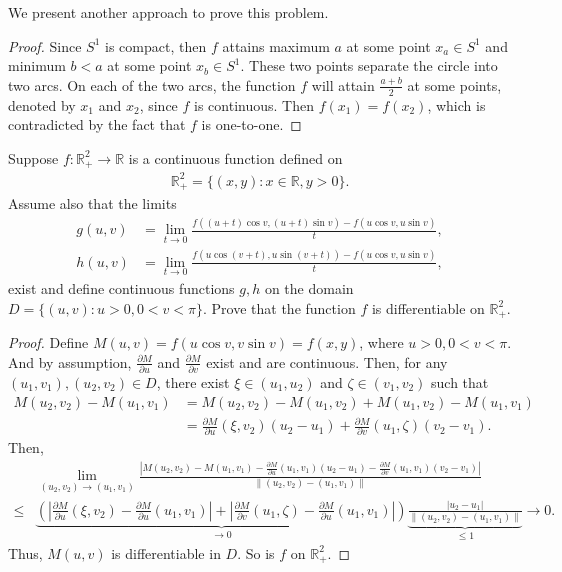 \documentclass[11pt]{article}
\theoremstyle{definition}
\numberwithin{equation}{subsection}
\begin{document}
We present another approach to prove this problem.
\begin{proof}
Since $S^1$ is compact, then $f$ attains maximum $a$ at some point $x_a \in S^1$ and minimum $b < a$ at some point $x_b \in S^1$. These two points separate the circle into two arcs. On each of the two arcs, the function $f$ will attain $\frac{a+b}{2}$ at some points, denoted by $x_1$ and $x_2$, since $f$ is continuous. Then $f(x_1) = f(x_2)$, which is contradicted by the fact that $f$ is one-to-one\cite{3}.
\end{proof}

\medskip

Suppose $f: \mathbb{R}^2_+ \to \mathbb{R}$ is a continuous function defined on
\begin{align*}
    \mathbb{R}^2_+ = \{(x,y): x \in \mathbb{R}, y > 0\}.
\end{align*}
Assume also that the limits
\begin{align*}
    g(u,v) & = \lim_{t \to 0} \frac{f((u+t)\cos v, (u+t)\sin v) - f(u\cos v, u\sin v)}{t}, \\
    h(u,v) & = \lim_{t \to 0} \frac{f(u\cos (v+t), u\sin (v+t)) - f(u\cos v, u\sin v)}{t},
\end{align*}
exist and define continuous functions $g, h$ on the domain $D = \{(u,v): u > 0, 0 < v < \pi\}$. Prove that the function $f$ is differentiable on $\mathbb{R}^2_+$.
\begin{proof}
Define $M(u,v) = f(u\cos v, v\sin v) = f(x,y)$, where $u > 0, 0 < v < \pi$. And by assumption, $\frac{\partial M}{\partial u}$ and $\frac{\partial M}{\partial v}$ exist and are continuous. Then, for any $(u_1, v_1), (u_2, v_2) \in D$, there exist $\xi \in (u_1, u_2)$ and $\zeta \in (v_1,v_2)$ such that
\begin{align*}
    M(u_2,v_2) - M(u_1,v_1) & = M(u_2,v_2) - M(u_1,v_2) + M(u_1,v_2) - M(u_1,v_1) \\
    & = \frac{\partial M}{\partial u}(\xi, v_2)(u_2 - u_1) + \frac{\partial M}{\partial v}(u_1, \zeta)(v_2 - v_1).
\end{align*}
Then,
\begin{align*}
    & \lim_{(u_2,v_2) \to (u_1,v_1)}  \frac{\left|M(u_2,v_2) - M(u_1,v_1) - \frac{\partial M}{\partial u}(u_1, v_1)(u_2 - u_1) - \frac{\partial M}{\partial v}(u_1, v_1)(v_2 - v_1) \right|}{\left\|(u_2,v_2) - (u_1,v_1)\right\|} \\
    \leq & \underbrace{\left(\left|\frac{\partial M}{\partial u}(\xi, v_2) - \frac{\partial M}{\partial u}(u_1, v_1)\right| + \left|\frac{\partial M}{\partial v}(u_1, \zeta) - \frac{\partial M}{\partial u}(u_1, v_1)\right| \right)}_{\to 0} \underbrace{\frac{|u_2 - u_1|}{\left\|(u_2,v_2) - (u_1,v_1)\right\|}}_{\leq 1} \to 0.
\end{align*}
Thus, $M(u,v)$ is differentiable in $D$. So is $f$ on $\mathbb{R}^2_+$.
\end{proof}
\end{document}
